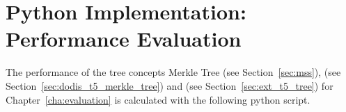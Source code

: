 \chapter{Python Implementation: Performance Evaluation}
\label{cha:appendix2_performance_calc}

The performance of the tree concepts Merkle Tree (see Section~\ref{sec:mss}), \tftree (see Section~\ref{sec:dodis_t5_merkle_tree}) and \extree (see Section~\ref{sec:ext_t5_tree}) for Chapter~\ref{cha:evaluation} is calculated with the following python script.

\inputminted[breaklines,linenos]{python}{scripts/performance_evaluation.py}